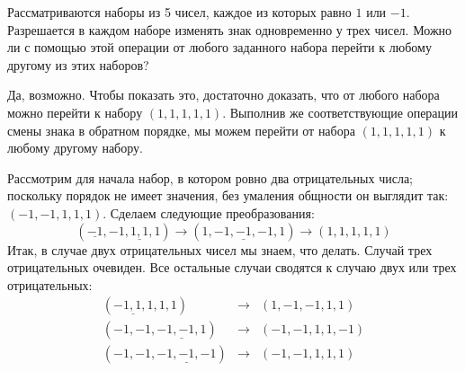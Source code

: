 
\begin{itemize}
\itB Рассматриваются наборы из 5 чисел, каждое из которых равно $1$ или $-1$. Разрешается в 
каждом наборе изменять знак одновременно у трех чисел. Можно ли с помощью этой операции 
от любого заданного набора перейти к любому другому из этих наборов?

\itr Да, возможно. Чтобы показать это, достаточно доказать, что от любого набора можно 
перейти к набору $(1,1,1,1,1)$. Выполнив же соответствующие операции смены знака в 
обратном порядке, мы можем перейти от набора $(1,1,1,1,1)$ к любому другому набору.

Рассмотрим для начала набор, в котором ровно два 
отрицательных числа;  поскольку порядок не имеет значения, без умаления общности он 
выглядит так: $(-1,-1,1,1,1)$. Сделаем следующие преобразования:
$$
(\underline{-1},-1,\underline{1,1},1)\to (1,\underline{-1,-1,-1},1) \to (1,1,1,1,1)
$$
Итак, в случае двух отрицательных чисел мы знаем, что делать. Случай трех отрицательных 
очевиден. Все остальные случаи сводятся к случаю двух или трех отрицательных:
$$\begin{array}{rcl}
(\underline{-1,1,1},1,1) &\to & (1,-1,-1,1,1) \\
(-1,-1,\underline{-1,-1,1}) & \to & (-1,-1,1,1,-1) \\
(-1,-1,\underline{-1,-1,-1}) & \to & (-1,-1,1,1,1)
\end{array}$$

%
%
\end{itemize}


